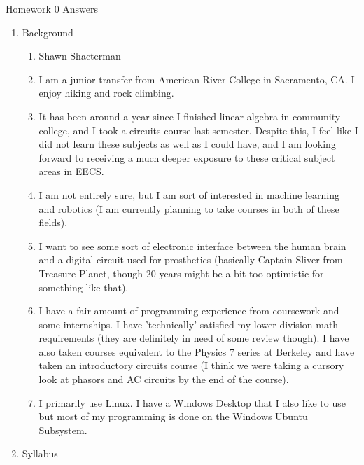 \documentclass{article}
\begin{document}
	\begin{center}
		\Huge Homework 0 Answers
	\end{center}
	
	\begin{enumerate}
		\huge
		\item Background
		
		\normalsize
		\begin{enumerate}
			\item Shawn Shacterman
			\item I am a junior transfer from American River College in Sacramento, CA. I enjoy hiking and rock climbing.
			\item It has been around a year since I finished linear algebra in community college, and I took a circuits course last semester. Despite this, I feel like I did not learn these subjects as well as I could have, and I am looking forward to receiving a much deeper exposure to these critical subject areas in EECS.
			\item I am not entirely sure, but I am sort of interested in machine learning and robotics (I am currently planning to take courses in both of these fields).
			\item I want to see some sort of electronic interface between the human brain and a digital circuit used for prosthetics (basically Captain Sliver from Treasure Planet, though 20 years might be a bit too optimistic for something like that).
			\item I have a fair amount of programming experience from coursework and some internships. I have 'technically' satisfied my lower division math requirements (they are definitely in need of some review though). I have also taken courses equivalent to the Physics 7 series at Berkeley and have taken an introductory circuits course (I think we were taking a cursory look at phasors and AC circuits by the end of the course).
			\item I primarily use Linux. I have a Windows Desktop that I also like to use but most of my programming is done on the Windows Ubuntu Subsystem.
			
		\end{enumerate}
		
		\huge
		\item Syllabus
		

\end{enumerate}
\end{document}
